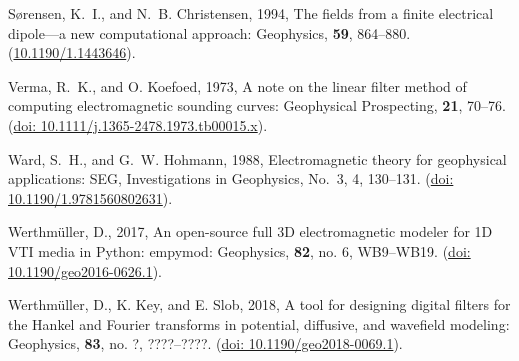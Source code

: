 \documentclass[a4paper, twoside, parskip, 10pt]{scrartcl}
\begin{document}
\begin{multicols}{2}
\begin{thebibliography}{}
Sørensen, K.~I., and N.~B. Christensen,  1994, The fields from a finite
  electrical dipole—a new computational approach: Geophysics, {\bf 59},
  864--880.
\newblock (\href{https://doi.org/10.1190/1.1443646}{10.1190/1.1443646}).

Verma, R.~K., and O. Koefoed,  1973, A note on the linear filter method of
  computing electromagnetic sounding curves: Geophysical Prospecting, {\bf 21},
  70--76.
\newblock (\href{https://doi.org/10.1111/j.1365-2478.1973.tb00015.x}{doi:
  10.1111/j.1365-2478.1973.tb00015.x}).

Ward, S.~H., and G.~W. Hohmann,  1988, Electromagnetic theory for geophysical
applications: SEG, Investigations in Geophysics, No.~3, 4, 130--131.
\newblock  (\href{https://doi.org/10.1190/1.9781560802631}{doi:
  10.1190/1.9781560802631}).

Werthmüller, D., 2017, An open-source full {3D} electromagnetic modeler for
  {1D} {VTI} media in {P}ython: empymod: Geophysics, {\bf 82}, no. 6,
  WB9--WB19.
\newblock (\href{https://doi.org/10.1190/geo2016-0626.1}{doi:
  10.1190/geo2016-0626.1}).

 Werthmüller, D., K. Key,
  and E. Slob, 2018, A tool for designing digital filters for the Hankel and
  Fourier transforms in potential, diffusive, and wavefield modeling:
  Geophysics, {\bf 83}, no. ?, ????--????.
\newblock (\href{https://doi.org/10.1190/geo2018-0069.1}{doi:
  10.1190/geo2018-0069.1}).

\end{thebibliography}

\end{multicols}
\end{document}
